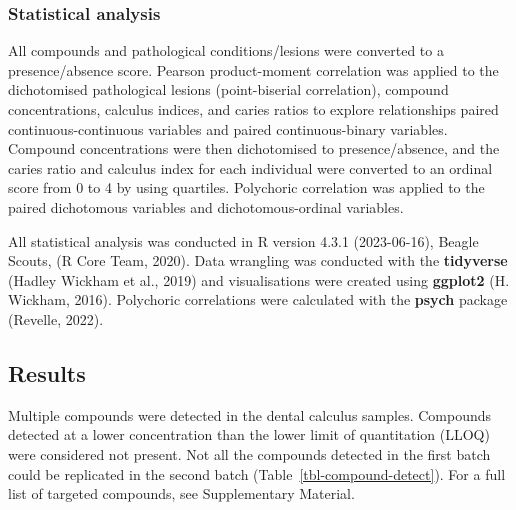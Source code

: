 \documentclass[
]{article}
\begin{document}
\hypertarget{statistical-analysis}{%
\subsubsection{Statistical analysis}\label{statistical-analysis}}

All compounds and pathological conditions/lesions were converted to a
presence/absence score. Pearson product-moment correlation was applied
to the dichotomised pathological lesions (point-biserial correlation),
compound concentrations, calculus indices, and caries ratios to explore
relationships paired continuous-continuous variables and paired
continuous-binary variables. Compound concentrations were then
dichotomised to presence/absence, and the caries ratio and calculus
index for each individual were converted to an ordinal score from 0 to 4
by using quartiles. Polychoric correlation was applied to the paired
dichotomous variables and dichotomous-ordinal variables.

All statistical analysis was conducted in R version 4.3.1 (2023-06-16),
Beagle Scouts, (R Core Team, 2020). Data wrangling was conducted with
the \textbf{tidyverse} (Hadley Wickham et al., 2019) and visualisations
were created using \textbf{ggplot2} (H. Wickham, 2016). Polychoric
correlations were calculated with the \textbf{psych} package (Revelle,
2022).

\hypertarget{results}{%
\subsection{Results}\label{results}}

Multiple compounds were detected in the dental calculus samples.
Compounds detected at a lower concentration than the lower limit of
quantitation (LLOQ) were considered not present. Not all the compounds
detected in the first batch could be replicated in the second batch
(Table~\ref{tbl-compound-detect}). For a full list of targeted
compounds, see Supplementary Material.
\end{document}
